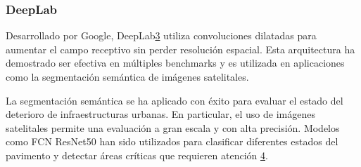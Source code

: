 \documentclass{article}
\begin{document}
\subsubsection{DeepLab}
Desarrollado por Google, DeepLab\href{https://www.semanticscholar.org/paper/DeepLab%3A-Semantic-Image-Segmentation-with-Deep-and-Chen-Papandreou/cab372bc3824780cce20d9dd1c22d4df39ed081a}{3} utiliza convoluciones dilatadas para aumentar el campo receptivo sin perder resolución espacial. Esta arquitectura ha demostrado ser efectiva en múltiples benchmarks y es utilizada en aplicaciones como la segmentación semántica de imágenes satelitales.


La segmentación semántica se ha aplicado con éxito para evaluar el estado del deterioro de infraestructuras urbanas. En particular, el uso de imágenes satelitales permite una evaluación a gran escala y con alta precisión. Modelos como FCN ResNet50 han sido utilizados para clasificar diferentes estados del pavimento y detectar áreas críticas que requieren atención \href{https://www.semanticscholar.org/paper/Semantic-Segmentation-of-Urban-Street-Scenes-Using-Noori-Shaker/a86227d6ffaa1cad529a78b66faf8bdb57f4fb16}{4}.
\end{document}
